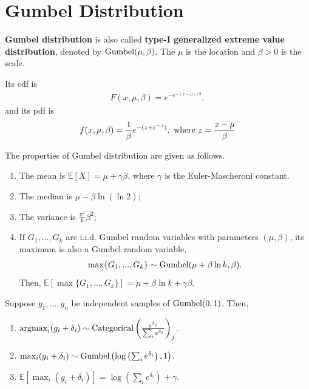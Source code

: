 \documentclass[11pt]{elegantbook}
\newcommand{\argmax}{\operatornamewithlimits{argmax}}
\begin{document}
\section{Gumbel Distribution}
\begin{definition}
    \textbf{Gumbel distribution} is also called \textbf{type-I generalized extreme value distribution}, denoted by $\textnormal{Gumbel}(\mu,\beta)$. The $\mu$ is the location and $\beta>0$ is the scale.

    Its cdf is
    \begin{equation}
        \begin{aligned}
            F(x,\mu,\beta)=e^{-e^{-(x-\mu)/\beta}},
        \end{aligned}
        \nonumber
    \end{equation}
    and its pdf is
    \begin{equation}
        \begin{aligned}
            f(x,\mu,\beta)=\frac{1}{\beta} e^{-(z+e^{-z})}, \textnormal{ where }z=\frac{x-\mu}{\beta}
        \end{aligned}
        \nonumber
    \end{equation}
\end{definition}
\begin{lemma}
    The properties of Gumbel distribution are given as follows.
    \begin{enumerate}
        \item The mean is $\mathbb{E}[X]=\mu+\gamma\beta$, where $\gamma$ is the Euler-Mascheroni constant.
        \item The median is $\mu-\beta\ln (\ln 2)$;
        \item The variance is $\frac{\pi^2}{6}\beta^2$;
        \item If $G_1,...,G_k$ are i.i.d. Gumbel random variables with parameters $(\mu,\beta)$, its maximum is also a Gumbel random variable,
        \begin{equation}
            \begin{aligned}
                \max\{G_1,...,G_k\}\sim \textnormal{Gumbel}(\mu+\beta\ln k,\beta).
            \end{aligned}
            \nonumber
        \end{equation}
        Then, $\mathbb{E}[\max\{G_1,...,G_k\}]=\mu+\beta\ln k + \gamma\beta$.
    \end{enumerate}
\end{lemma}
\begin{lemma}\label{lemma:max_gumbel}
    Suppose $g_1,...,g_n$ be independent samples of $\textnormal{Gumbel}(0,1)$. Then,
    \begin{enumerate}
        \item $\argmax_i(g_i + \delta_i)\sim \textnormal{Categorical}\left(\frac{e^{\delta_j}}{\sum_{i}e^{\delta_i}}\right)_j$.
        \item $\max_{i}(g_i + \delta_i) \sim \textnormal{Gumbel}\left(\log\left(\sum_{i}e^{\delta_i}\right),1\right)$.
        \item $\mathbb{E}[\max_{i}(g_i + \delta_i)]=\log\left(\sum_{i}e^{\delta_i}\right)+\gamma$.
    \end{enumerate}
\end{lemma}
\end{document}
